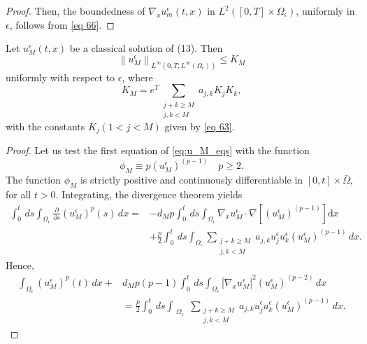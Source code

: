 \begin{proof}
Then, the boundedness of $\nabla_{x} u_{m}^{\epsilon}(t, x)$ in $L^{2}\left([0, T] \times \Omega_{\epsilon}\right)$, uniformly in $\epsilon$, follows from \eqref{eq 66}.
\end{proof}
\begin{lemma} Let $u_{M}^{\epsilon}(t, x)$ be a classical solution of (13). Then
$$
\left\|u_{M}^{\epsilon}\right\|_{L^{\infty}\left(0, T ; L^{\infty}\left(\Omega_{\epsilon}\right)\right)} \leq K_{M}
$$
uniformly with respect to $\epsilon$, where
$$
K_{M}=e^{T} \sum_{\substack{j+k \geq M \\
j,k<M}} a_{j, k} K_{j} K_{k},
$$
with the constants $K_{j}(1<j<M)$ given by \eqref{eq 63}.
\label{lemma 5.7}\end{lemma}
\begin{proof}
Let us test the first equation of \eqref{eq:u_M_eqs} with the function
$$
\phi_{M} \equiv p\left(u_{M}^{\epsilon}\right)^{(p-1)} \quad p \geq 2 .
$$
The function $\phi_{M}$ is strictly positive and continuously differentiable in $[0, t] \times \bar{\Omega}$, for all $t>0$. Integrating, the divergence theorem yields
\begin{equation}
  \begin{aligned}
\int_{0}^{t} \, d  s \int_{\Omega_{\epsilon}} \frac{\partial}{\partial s}\left(u_{M}^{\epsilon}\right)^{p}(s) \, {d} x=&-d_{M} p \int_{0}^{t} \, d  s \int_{\Omega_{\epsilon}} \nabla_{x} u_{M}^{\epsilon} \cdot \nabla\left[\left(u_{M}^{\epsilon}\right)^{(p-1)}\right] \mathrm{d} x \\
&+\frac{p}{2} \int_{0}^{t} \, d  s \int_{\Omega_{\epsilon}} \sum_{\substack{j+k \geq M \\
j,k<M}} a_{j, k} u_{j}^{\epsilon} u_{k}^{\epsilon}\left(u_{M}^{\epsilon}\right)^{(p-1)} \, {d} x.
\end{aligned}
\label{eq 69}\end{equation}
Hence,
\begin{equation}
  \begin{aligned}
\int_{\Omega_{\epsilon}}\left(u_{M}^{\epsilon}\right)^{p}(t) \, {d} x+& d_{M} p(p-1) \int_{0}^{t} \, d  s \int_{\Omega_{\epsilon}}\left|\nabla_{x} u_{M}^{\epsilon}\right|^{2}\left(u_{M}^{\epsilon}\right)^{(p-2)} \, {d} x \\
&=\frac{p}{2} \int_{0}^{t} \, d  s \int_{\substack{\Omega_{\epsilon}}} \sum_{\substack{j+k \geq M \\
j,k<M}} a_{j, k} u_{j}^{\epsilon} u_{k}^{\epsilon}\left(u_{M}^{\epsilon}\right)^{(p-1)} \, {d} x.
\end{aligned}
\label{eq 70}\end{equation}

\end{proof}

